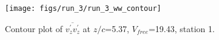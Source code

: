 \begin{figure}[H]
\centering
\texttt{[image: figs/run\_3/run\_3\_ww\_contour]}
\caption{Contour plot of $\overline{v_{z}^{\prime} v_{z}^{\prime}}$ at $z/c$=5.37, $V_{free}$=19.43, station 1.}
\label{fig:run_3_ww_contour}
\end{figure}


